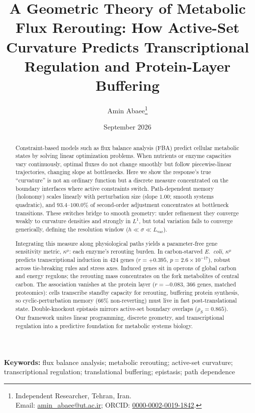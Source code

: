 \documentclass[11pt,a4paper]{article}
\title{A Geometric Theory of Metabolic Flux Rerouting: How Active-Set
       Curvature Predicts Transcriptional Regulation and
       Protein-Layer Buffering}
\author{Amin Abaee\thanks{Independent Researcher, Tehran, Iran.\\
  Email: \href{mailto:amin_abaee@ut.ac.ir}{amin\_abaee@ut.ac.ir}; ORCID:
  \href{https://orcid.org/0000-0002-0019-1842}{0000-0002-0019-1842}.}}
\date{September 2026}
\theoremstyle{plain}
\theoremstyle{definition}
\theoremstyle{remark}
\newcommand{\kmu}{\kappa^{\mu}}
\begin{document}
\linenumbers
\maketitle

\begin{abstract}
\noindent
Constraint-based models such as flux balance analysis (FBA) predict cellular
metabolic states by solving linear optimization problems. When
nutrients or enzyme capacities vary continuously, optimal fluxes do
not change smoothly but follow piecewise-linear trajectories, changing slope
at bottlenecks. Here we show the response's true
``curvature'' is not an ordinary function but a
discrete measure concentrated on the boundary interfaces where active
constraints switch. Path-dependent memory (holonomy) scales linearly with
perturbation size (slope $1.00$; smooth systems quadratic), and
$93.4$--$100.0\%$ of second-order adjustment concentrates at
bottleneck transitions. These switches bridge to smooth
geometry: under refinement they converge weakly to
curvature densities and strongly in $L^1$, but total variation
fails to converge generically, defining the resolution window ($h \ll
\sigma \ll L_{\mathrm{var}}$).

Integrating this measure along physiological paths yields a
parameter-free gene sensitivity metric, $\kmu$: each enzyme's
rerouting burden. In carbon-starved \emph{E.~coli}, $\kmu$
predicts transcriptional induction in $424$ genes
($r = +0.395$, $p = 2.6 \times 10^{-17}$),
robust across tie-breaking rules and stress axes. Induced
genes sit in operons of global carbon and energy regulons;
the rerouting mass concentrates on the fork metabolites of
central carbon. The association vanishes at the protein layer
($r = -0.083$, $366$ genes, matched proteomics):
cells transcribe standby capacity for rerouting, buffering protein
synthesis, so cyclic-perturbation memory ($66\%$ non-reverting)
must live in fast post-translational state.
Double-knockout epistasis mirrors active-set boundary overlaps
($\rho_S = 0.865$). Our framework unites linear programming,
discrete geometry, and transcriptional regulation into a
predictive foundation for metabolic systems biology.
\end{abstract}

\medskip
\noindent\textbf{Keywords:} flux balance analysis; metabolic
rerouting; active-set curvature; transcriptional regulation;
translational buffering; epistasis; path dependence

\bigskip

\end{document}
